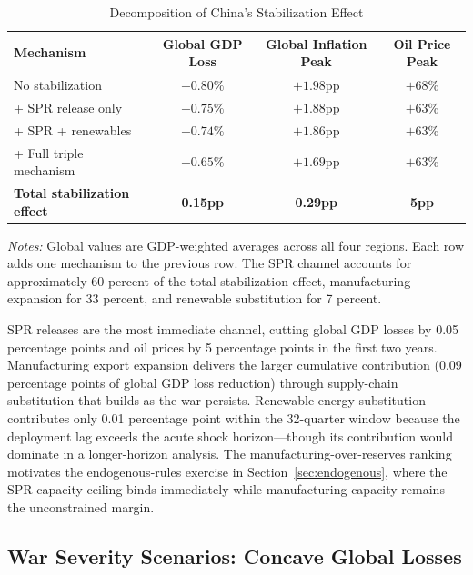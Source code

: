 \documentclass[12pt]{article}
\begin{document}
\begin{table}[H]
\centering
\small
\begin{threeparttable}
\caption{Decomposition of China's Stabilization Effect}
\label{tab:china_decomp}
\begin{tabular}{@{}lccc@{}}
\toprule
Mechanism & Global GDP Loss & Global Inflation Peak & Oil Price Peak \\
\midrule
No stabilization & $-0.80\%$ & $+1.98$pp & $+68\%$ \\
\quad + SPR release only & $-0.75\%$ & $+1.88$pp & $+63\%$ \\
\quad + SPR + renewables & $-0.74\%$ & $+1.86$pp & $+63\%$ \\
\quad + Full triple mechanism & $-0.65\%$ & $+1.69$pp & $+63\%$ \\
\addlinespace
\textbf{Total stabilization effect} & \textbf{0.15pp} & \textbf{0.29pp} & \textbf{5pp} \\
\bottomrule
\end{tabular}
\begin{tablenotes}[flushleft]
\small
\item \textit{Notes:} Global values are GDP-weighted averages across all four regions. Each row adds one mechanism to the previous row. The SPR channel accounts for approximately 60 percent of the total stabilization effect, manufacturing expansion for 33 percent, and renewable substitution for 7 percent.
\end{tablenotes}
\end{threeparttable}
\end{table}

SPR releases are the most immediate channel, cutting global GDP losses by 0.05 percentage points and oil prices by 5 percentage points in the first two years. Manufacturing export expansion delivers the larger cumulative contribution (0.09 percentage points of global GDP loss reduction) through supply-chain substitution that builds as the war persists. Renewable energy substitution contributes only 0.01 percentage point within the 32-quarter window because the deployment lag exceeds the acute shock horizon---though its contribution would dominate in a longer-horizon analysis. The manufacturing-over-reserves ranking motivates the endogenous-rules exercise in Section~\ref{sec:endogenous}, where the SPR capacity ceiling binds immediately while manufacturing capacity remains the unconstrained margin.

\subsection{War Severity Scenarios: Concave Global Losses}
\end{document}
